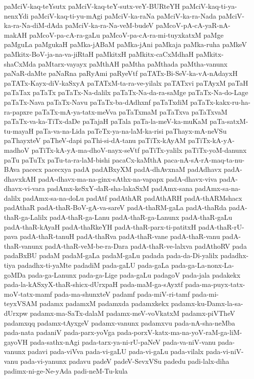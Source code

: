 {paMciV-kaq-teYsutx
paMciV-kaq-teY-sutx-veY-BURteYH
paMciV-kaq-ti-ya-nenxYdi
paMciV-kaq-ti-yu-mAgi
paMciV-ka-raNa
paMciV-ka-ra-Nada
paMciV-ka-ra-Na-diM-dAda
paMciV-ka-ra-Na-veM-budeV
paMcoV-pA-cA-yaR-nA-makAH
paMcoV-pa-cA-ra-gaLu
paMcoV-pa-cA-ra-mi-tuyxkatxM
paMge
paMguLa
paMgukaH
paMka-jABaM
paMka-jAni
paMkaja
paMka-ruha
paMkeV
paMkitx-BoV-ja-na-va-jiRtaH
paMkitxH
paMkitx-caCxMdhaH
paMkitx-shaCxMda
paMtarx-vayayx
paMthAH
paMtha
paMthada
paMtha-vanunx
paNaR-daMte
paNaRna
paRyAmi
paRyeVtf
paTATx-Bi-SeV-ka-vA-nAdayxH
paTATx-Kayx-diV-kaSxyA
paTATxM-ta-ra-ve-yilalx
paTATxvi
paTAyxM
paTaH
paTaTax
paTaTx
paTaTx-Na-dalilx
paTaTx-Na-da-ra-saMge
paTaTx-Na-do-Lage
paTaTx-Nava
paTaTx-Navu
paTaTx-ba-dAdhxnf
paTaTxdiM
paTaTx-kakx-ru-ha-ra-papxre
paTaTx-mA-ya-tatx-meVva
paTaTxmaM
paTaTxva
paTaTxvaM
paTaTx-va-ka-TiTx-daDe
paTajaH
paTala
paTa-la-meV-ka-muKaM
paTa-satxM-tu-mayaH
paTa-va-na-Lida
paTeTx-ya-na-laM-ka-risi
paThayx-mA-neVSu
paThayxteV
paTheV-dapi
paThi-si-dA-tanu
paTiTx-kAyAM
paTiTx-kA-yA-madhoV
paTiTx-kA-yA-ma-dhoV-nayx-seVtf
paTiTx-yalilx
paTiTx-yoM-danunx
paTu
paTuTx
paTu-ta-ra-laM-bishi
pacaCx-kaMthA
paca-nA-sA-rA-maq-ta-nu-BAva
pacecx
pacecxya
padA
padABxyXM
padA-dhAvxnaM
padAdhavx
padA-dhavxkAH
padA-dhavx-ma-na-ginx-sAthx-na-vapapx
padA-dhavx-viva
padA-dhavx-vi-vara
padAmx-keSxY-daR-sha-lakaSxM
padAmx-sana
padAmx-sa-na-dalilx
padAmx-sa-na-doLu
padAtf
padAthAR
padAthARH
padA-thARMshacx
padAthaR
padA-thaR-BoV-gA-va-sareV
padA-thaRM-gaLa
padA-thaRda
padA-thaR-ga-Lalilx
padA-thaR-ga-Lanu
padA-thaR-ga-Lanunx
padA-thaR-gaLu
padA-thaR-kAyaH
padA-thaRkeYH
padA-thaR-parx-ti-patitxH
padA-thaR-rU-pava
padA-thaR-tanuH
padA-thaRva
padA-thaR-vane
padA-thaR-vanu
padA-thaR-vanunx
padA-thaR-veM-be-ra-Dara
padA-thaR-ve-lalxva
padAthoRV
pada
padaBxBU
padaM
padaM-gaLa
padaM-gaLu
padada
pada-da-Di-yalilx
padadhx-tiya
padadhx-ti-yaMte
padadiM
pada-gaLU
pada-gaLa
pada-ga-La-nonx-La-goMDa
pada-ga-Lanunx
pada-ga-Lige
pada-gaLu
padagoV
pada-jala
padakekx
pada-la-kASxyX-thaR-shicx-dUrxpaH
pada-maM-ga-sAyxtf
pada-ma-puyx-tatx-moV-tatx-mamf
pada-ma-shunxteV
padamf
pada-miV-ri-tamf
pada-mi-teyxVSAM
padamx
padamxM
padamxda
padamxkekx
padamx-ku-Damx-la-sa-dUrxpw
padamx-ma-SaTx-dalaM
padamx-meV-voVkatxM
padamx-piVTheV
padamxqq
padamx-tAyxgeV
padamx-vanunx
padamxvu
pada-nA-sha-neMba
pada-nata
padaniV
pada-parx-yoVga
pada-porxV-katx-ma-na-yoV-raM-ga-liM-gayoVH
pada-sathx-nAgi
pada-tarx-ya-ni-rU-paNeV
pada-va-niV-vanu
pada-vanunx
padavi
pada-viVva
pada-vi-gaLU
pada-vi-gaLu
pada-vilalx
pada-vi-niV-vanu
pada-vi-yanunx
padavu
padeV
padeV-SevxVSu
padedu
padi-lalx-diha
padimx-ni-ge-Ne-yAda
padi-neM-Tu-kula
}
